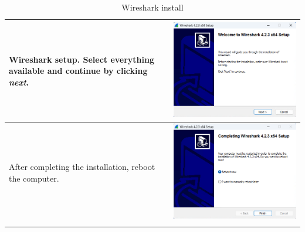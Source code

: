 \documentclass[11pt,a4paper]{report}
\begin{document}
\begin{flushleft}
\begin{center}
\begin{longtable}{ m{5cm} l }
                        Wireshark setup. Select everything available and continue by clicking \textit{next}.
                        & \includegraphics[scale=0.80,valign=c]{install_wireshark02} \\
                        \hline
                        After completing the installation, reboot the computer.
                        & \includegraphics[scale=0.80,valign=c]{install_wireshark21} \\
                        \hline

                        \caption{Wireshark install} \label{tab:wireshark}
                    \end{longtable}
                \end{center}
        \end{flushleft}
\end{document}
